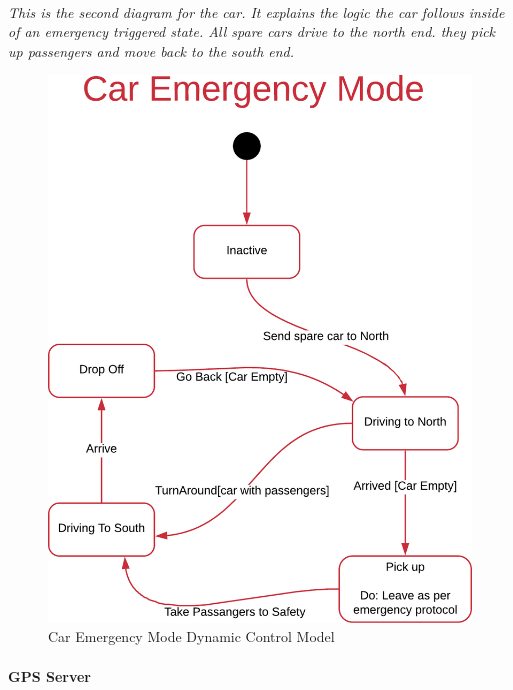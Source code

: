 \documentclass[12pt]{article}
\begin{document}
    \paragraph{}\textit{This is the second diagram for the car. It explains the logic the car follows inside of an emergency triggered state. All spare cars drive to the north end. they pick up passengers and move back to the south end.}
    \begin{figure}[H]
         \centerline{\includegraphics[scale=0.80]{CarEmergencyMode.png}}
         \caption{Car Emergency Mode Dynamic Control Model}
          \label{fig:caremergencymode}
    \end{figure}

    \paragraph{GPS Server}
\end{document}

